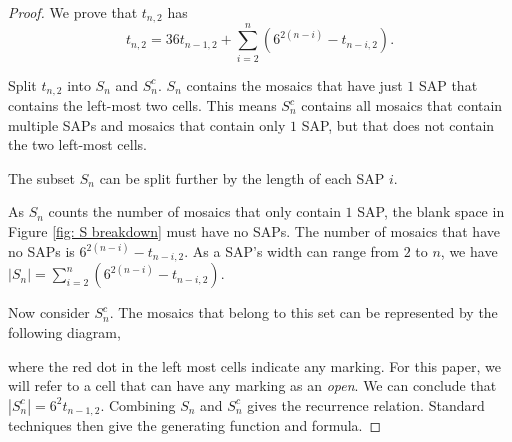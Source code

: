 \documentclass[12pt]{article}
\theoremstyle{plain}
\theoremstyle{definition}
\theoremstyle{remark}
\theoremstyle{definition}
\newcommand{\cellopen}[4]{ \draw[thick] ( #1 , #2 ) rectangle ( #3 , #4 ); \node[shape=circle,draw=red,fill=red, inner sep=0pt,minimum size=3pt] (A) at ( #1 * 0.5 + #3 * 0.5 , #2 * 0.5 + #4 * 0.5 ){};}
\newcommand{\cellA}[4]{\draw[red, thick, densely dotted] ( #1 + 0.5 , #2 ) arc(0:90:{0.5}); \draw[thick] ( #1 , #2 ) rectangle ( #3 , #4 );}
\newcommand{\cellB}[4]{\draw[red, thick, densely dotted] ( #1 + 1 , #2 + 0.5 ) arc(90:180:{0.5}); \draw[thick] ( #1 , #2 ) rectangle ( #3 , #4 );}
\newcommand{\cellC}[4]{\draw[red, thick, densely dotted] ( #1 + 0.5, #2 + 1 ) arc(180:270:{0.5}); \draw[thick] ( #1 , #2 ) rectangle ( #3 , #4 );}
\newcommand{\cellD}[4]{\draw[red, thick, densely dotted] ( #1 , #2 + 0.5 ) arc(-90:0:{0.5}); \draw[thick] ( #1 , #2 ) rectangle ( #3 , #4 );}
\newcommand{\cellF}[4]{\draw[red, thick, densely dotted] (#3 * 0.5 + #1 * 0.5 , #2) -- (#3 * 0.5 + #1 * 0.5 , #4); \draw[thick] ( #1 , #2 ) rectangle ( #3 , #4 );}
\begin{document}
\begin{proof}
We prove that $t_{n,2}$ has
$$t_{n,2} = 36t_{n-1,2} + \sum_{i=2}^{n}(6^{2(n-i)}-t_{n-i,2}).$$

Split $t_{n,2}$ into $S_n$ and $S_n^c$. $S_n$ contains the mosaics that have just $1$ SAP that contains the left-most two cells. This means $S_n^c$ contains all mosaics that contain multiple SAPs and mosaics that contain only $1$ SAP, but that does not contain the two left-most cells.

The subset $S_n$ can be split further by the length of each SAP $i$. 

\begin{center}
\end{center}

As $S_n$ counts the number of mosaics that only contain $1$ SAP, the blank space in Figure \ref{fig: S breakdown} must have no SAPs. The number of mosaics that have no SAPs is $6^{2(n-i)}-t_{n-i,2}$. As a SAP's width can range from $2$ to $n$, we have $|S_n| = \sum_{i=2}^{n}(6^{2(n-i)}-t_{n-i,2}).$

Now consider $S_n^c$. The mosaics that belong to this set can be represented by the following diagram,

\begin{center}
\label{fig: Sc breakdown}
\end{center}

where the red dot in the left most cells indicate any marking. For this paper, we will refer to a cell that can have any marking as an \textit{open}. We can conclude that $|S_n^c| = 6^{2}t_{n-1,2}$. Combining $S_n$ and $S_n^c$ gives the recurrence relation. Standard techniques then give the generating function and formula.
\end{proof}
\end{document}
